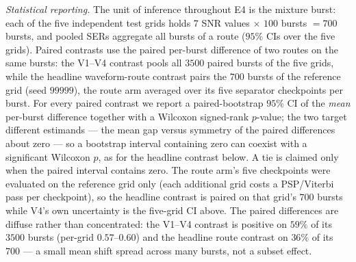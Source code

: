 \documentclass[journal]{IEEEtran}
\begin{document}
\emph{Statistical reporting.} The unit of inference throughout E4 is
the mixture burst: each of the five independent test grids holds
$7$ SNR values $\times$ $100$ bursts $= 700$ bursts, and pooled SERs
aggregate all bursts of a route ($95\%$ CIs over the five grids).
Paired contrasts use the paired per-burst difference of two routes on
the same bursts: the V1--V4 contrast pools all $3500$ paired bursts of
the five grids, while the headline waveform-route contrast pairs the
$700$ bursts of the reference grid (seed $99999$), the route arm
averaged over its five separator checkpoints per burst. For every
paired contrast we report a paired-bootstrap $95\%$ CI of the
\emph{mean} per-burst difference together with a Wilcoxon signed-rank
$p$-value; the two target different estimands --- the mean gap versus
symmetry of the paired differences about zero --- so a bootstrap
interval containing zero can coexist with a significant Wilcoxon $p$,
as for the headline contrast below. A tie is claimed only when the
paired interval contains zero. The route arm's five checkpoints were
evaluated on the reference grid only (each additional grid costs a
PSP/Viterbi pass per checkpoint), so the headline contrast is paired on
that grid's $700$ bursts while V4's own uncertainty is the five-grid CI
above. The paired differences are diffuse rather than concentrated: the
V1--V4 contrast is positive on $59\%$ of its $3500$ bursts (per-grid
$0.57$--$0.60$) and the headline route contrast on $36\%$ of its $700$
--- a small mean shift spread across many bursts, not a subset effect.
\end{document}
